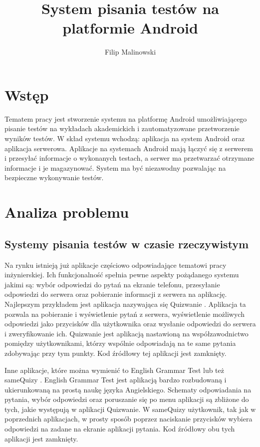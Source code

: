 \documentclass[eng]{mgr}
\title{System pisania testów na platformie Android}
\author{Filip Malinowski}
\begin{document}
\maketitle

\tableofcontents

	\chapter*{Wstęp}
	
	Tematem pracy jest stworzenie systemu na platformę Android umożliwiającego pisanie testów na wykładach akademickich i zautomatyzowane przetworzenie wyników testów. W skład systemu wchodzą: aplikacja na system Android oraz aplikacja serwerowa. Aplikacje na systemach Android mają łączyć się z serwerem i przesyłać informacje o wykonanych testach, a serwer ma przetwarzać otrzymane informacje i je magazynować. System ma być niezawodny pozwalając na bezpieczne wykonywanie testów.

	
	\chapter{Analiza problemu}
	
		\section{Systemy pisania testów w czasie rzeczywistym}
		Na rynku istnieją już aplikacje częściowo odpowiadające tematowi pracy inżynierskiej. Ich funkcjonalność spełnia pewne aspekty pożądanego systemu jakimi są: wybór odpowiedzi do pytań na ekranie telefonu, przesyłanie odpowiedzi do serwera oraz pobieranie informacji z serwera na aplikację. Najlepszym przykładem jest aplikacja nazywająca się Quizwanie \cite{quizwanie}. Aplikacja ta pozwala na pobieranie i wyświetlenie pytań z serwera, wyświetlenie możliwych odpowiedzi jako przycisków dla użytkownika oraz wysłanie odpowiedzi do serwera i zweryfikowanie ich. Quizwanie jest aplikacją nastawioną na współzawodnictwo pomiędzy użytkownikami, którzy wspólnie odpowiadają na te same pytania zdobywając przy tym punkty. Kod źródłowy tej aplikacji jest zamknięty.
	
		Inne aplikacje, które można wymienić to English Grammar Test \cite{englishgrammar} lub też sameQuizy \cite{samequizy}. English Grammar Test jest aplikacją bardzo rozbudowaną i ukierunkowaną na prostą naukę języka Angielskiego. Schematy odpowiadania na pytania, wybór odpowiedzi oraz poruszanie się po menu aplikacji są zbliżone do tych, jakie występują w aplikacji Quizwanie. W sameQuizy użytkownik, tak jak w poprzednich aplikacjach, w prosty sposób poprzez naciskanie przycisków wybiera odpowiedzi na zadane na ekranie aplikacji pytania. Kod źródłowy obu tych aplikacji jest zamknięty.
		
\end{document}
